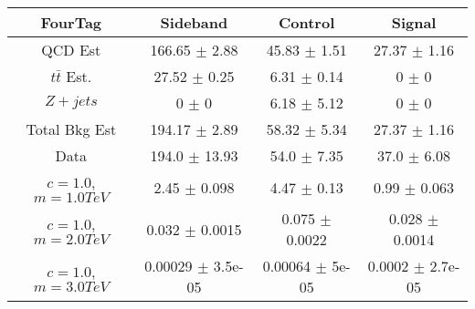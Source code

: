 \begin{footnotesize} 
\begin{tabular}{c|c|c|c} 
FourTag & Sideband & Control & Signal \\ 
\hline\hline 
QCD Est & 166.65 $\pm$ 2.88 & 45.83 $\pm$ 1.51 & 27.37 $\pm$ 1.16\\ 
$t\bar{t}$ Est.  & 27.52 $\pm$ 0.25 & 6.31 $\pm$ 0.14 & 0 $\pm$ 0\\ 
$Z+jets$ & 0 $\pm$ 0 & 6.18 $\pm$ 5.12 & 0 $\pm$ 0\\ 
Total Bkg Est & 194.17 $\pm$ 2.89 & 58.32 $\pm$ 5.34 & 27.37 $\pm$ 1.16\\ 
Data & 194.0 $\pm$ 13.93 & 54.0 $\pm$ 7.35 & 37.0 $\pm$ 6.08\\ 
$c=1.0$,$m=1.0TeV$ & 2.45 $\pm$ 0.098 & 4.47 $\pm$ 0.13 & 0.99 $\pm$ 0.063\\ 
$c=1.0$,$m=2.0TeV$ & 0.032 $\pm$ 0.0015 & 0.075 $\pm$ 0.0022 & 0.028 $\pm$ 0.0014\\ 
$c=1.0$,$m=3.0TeV$ & 0.00029 $\pm$ 3.5e-05 & 0.00064 $\pm$ 5e-05 & 0.0002 $\pm$ 2.7e-05\\ 
\hline\hline 
\end{tabular} 
\end{footnotesize} 
\newline 
